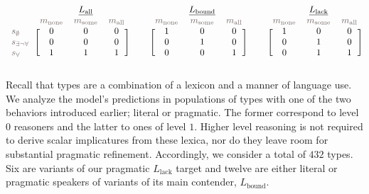 \documentclass[a4paper]{article}
\newcommand{\state}{\ensuremath{s}\xspace}		%
\newcommand{\mystate}[1]{\ensuremath{\state_{\text{#1}}}\xspace} %
\newcommand{\mylang}[1]{\ensuremath{L_{\text{#1}}}\xspace} %
\newcommand{\messg}{\ensuremath{m}\xspace}		%
\newcommand{\mymessg}[1]{\ensuremath{\messg_{\text{#1}}}\xspace} %
\newcommand{\ssome}{\mystate{\ensuremath{\exists\neg\forall}}}
\newcommand{\sall}{\mystate{\ensuremath{\forall}}}
\newcommand{\snone}{\mystate{\ensuremath{\emptyset}}}
\newcommand{\msome}{\mymessg{some}}
\newcommand{\mall}{\mymessg{all}}
\newcommand{\mnone}{\mymessg{none}}
\newcommand{\Lall}{\mylang{all}}
\newcommand{\Lbound}{\mylang{bound}}
\newcommand{\Llack}{\mylang{lack}}
\newcommand{\mygray}[1]{{\textcolor{mygray}{#1}}}
\begin{document}
\begin{align*}
  \begin{blockarray}{lccc}
    & & \underline{\Lall} & \\
    & \mygray{\mnone} & \mygray{\msome} & \mygray{\mall} \\
    \begin{block}{l[ccc]}
     \mygray{\snone}  & 0 & 0 & 0\\
     \mygray{\ssome}  & 0 & 0 & 0\\
    \mygray{\sall}   & 1 & 1 & 1\\
    \end{block}
  \end{blockarray} & &
 \begin{blockarray}{lccc}
    & & \underline{\Lbound} & \\
    & \mygray{\mnone} & \mygray{\msome} & \mygray{\mall} \\
    \begin{block}{l[ccc]}
       & 1 & 0 & 0\\
       & 0 & 1 & 0\\
       & 0 & 0 & 1\\
    \end{block}
  \end{blockarray} & &
  \begin{blockarray}{lccc}
    & & \underline{\Llack} & \\
    & \mygray{\mnone} & \mygray{\msome} & \mygray{\mall} \\
    \begin{block}{l[ccc]}
       & 1 & 0 & 0\\
       & 0 & 1 & 0\\
       & 0 & 1 & 1\\
    \end{block}
  \end{blockarray}
\end{align*}



Recall that types are a combination of a lexicon and a manner of language use. We analyze the model's predictions in populations of types with one of the two behaviors introduced earlier; literal or pragmatic. The former correspond to level $0$ reasoners and the latter to ones of level $1$. Higher level reasoning is not required to derive scalar implicatures from these lexica, nor do they leave room for substantial pragmatic refinement. Accordingly, we consider a total of $432$ types. Six are variants of our pragmatic $\Llack$ target and twelve are either literal or pragmatic speakers of variants of its main contender, $\Lbound$.
\end{document}
